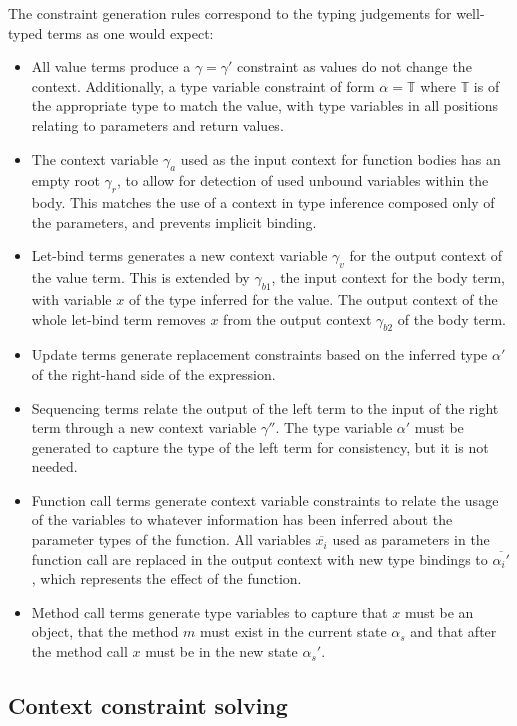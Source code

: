\documentclass[preprint]{sigplanconf}
\begin{document}
The constraint generation rules correspond to the typing judgements for 
well-typed terms as one would expect:

\begin{itemize}
\item All value terms produce a $\gamma = \gamma'$ constraint as values do
not change the context. Additionally, a type variable constraint of form
$\alpha = \mathbb{T}$ where $\mathbb{T}$ is of the appropriate type to match
the value, with type variables in all positions relating to parameters and return
values.
\item The context variable $\gamma_a$ used as the input context for
function bodies has an empty root $\gamma_r$, to allow for detection of 
used unbound variables within
the body. This matches the use of a context in type inference
composed only of the parameters, and prevents implicit binding.
\item Let-bind terms generates a new context variable $\gamma_v$ for the
output context of the value term. This is extended by $\gamma_{b1}$, the
input context for the body term, with variable $x$ of the type inferred
for the value. The output context of the whole let-bind term removes
$x$ from the output context $\gamma_{b2}$ of the body term.
\item Update terms generate replacement constraints based on the inferred
type $\alpha'$ of the right-hand side of the expression.
\item Sequencing terms relate the output of the left term to the input of the
right term through a new context variable $\gamma''$. The type variable
$\alpha'$ must be generated to capture the type of the left term for
consistency, but it is not needed.
\item Function call terms generate context variable constraints to relate the
usage of the variables to whatever information has been inferred about the
parameter types of the function. All variables $\overline{x_i}$ used as 
parameters in the function call are replaced in the output context with
new type bindings to $\overline{\alpha_i'}$, which represents the effect
of the function.
\item Method call terms generate type variables to capture that $x$ must
be an object, that the method $m$ must exist in the current state $\alpha_s$
and that after the method call $x$ must be in the new state $\alpha_s'$.
\end{itemize}

\subsection{Context constraint solving}
\end{document}
